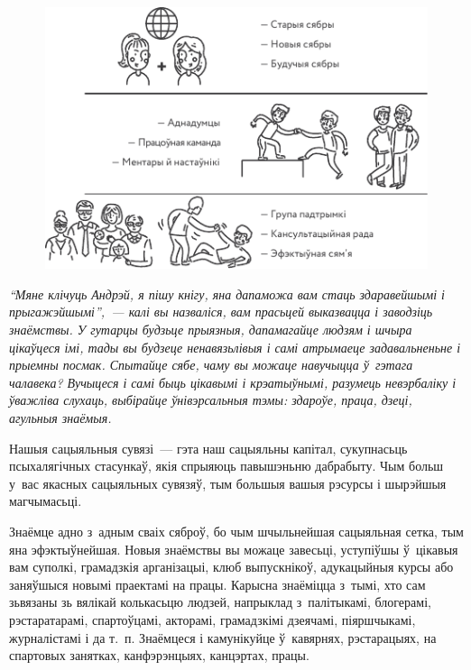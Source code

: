 \begin{figure}[htb!]
  \centering
  \includegraphics[scale=1.5]{willpower/ch10/6.pdf}
\end{figure}

\emph{``Мяне клічуць Андрэй, я пішу кнігу, яна дапаможа вам стаць здаравейшымі і прыгажэйшымі'',~--- калі вы назваліся, вам прасьцей выказвацца і заводзіць знаёмствы. У гутарцы будзьце прыязныя, дапамагайце людзям і шчыра цікаўцеся імі, тады вы будзеце ненавязьлівыя і самі атрымаеце задавальненьне і прыемны посмак. Спытайце сябе, чаму вы можаце навучыцца ў~гэтага чалавека? Вучыцеся і самі быць цікавымі і крэатыўнымі, разумець невэрбаліку і ўважліва слухаць, выбірайце ўнівэрсальныя тэмы: здароўе, праца, дзеці, агульныя знаёмыя.}

Нашыя сацыяльныя сувязі~--- гэта наш сацыяльны капітал, сукупнасьць псыхалягічных стасункаў, якія спрыяюць павышэньню дабрабыту. Чым больш у~вас якасных сацыяльных сувязяў, тым большыя вашыя рэсурсы і шырэйшыя магчымасьці.


Знаёмце адно з~адным сваіх сяброў, бо чым шчыльнейшая сацыяльная сетка, тым яна эфэктыўнейшая. Новыя знаёмствы вы можаце завесьці, уступіўшы ў~цікавыя вам суполкі, грамадзкія арганізацыі, клюб выпускнікоў, адукацыйныя курсы або заняўшыся новымі праектамі на працы. Карысна знаёміцца з~тымі, хто сам зьвязаны зь вялікай колькасьцю людзей, напрыклад з~палітыкамі, блогерамі, рэстаратарамі, спартоўцамі, акторамі, грамадзкімі дзеячамі, піяршчыкамі, журналістамі і да т.~п. Знаёмцеся і камунікуйце ў~кавярнях, рэстарацыях, на спартовых занятках, канфэрэнцыях, канцэртах, працы.

